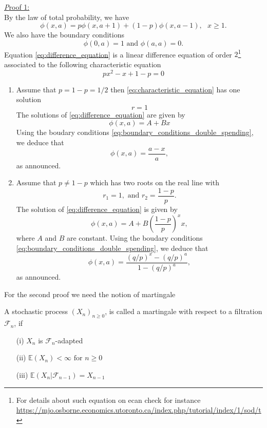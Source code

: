 \underline{\textit Proof 1:}\\
By the law of total probability, we have 
\begin{equation}\label{eq:difference_equation}
\phi(x,a) = p\phi(x,a+1)+(1-p)\phi(x,a-1),\text{ }x\geq1.
\end{equation}
We also have the boundary conditions
\begin{equation}\label{eq:boundary_conditions_double_spending}
\phi(0,a) = 1\text{ and }\phi(a,a) = 0.
\end{equation}
Equation \eqref{eq:difference_equation} is a linear difference equation of order $2$\footnote{For details about such equation on ecan check for instance \url{https://mjo.osborne.economics.utoronto.ca/index.php/tutorial/index/1/sod/t}} associated to the following characteristic equation
\begin{equation}\label{eq:characteristic_equation}
px^2 - x + 1-p = 0
\end{equation}
\begin{enumerate}

\item Assume that $p=1-p=1/2$ then \eqref{eq:characteristic_equation} has one solution 
$$
r = 1
$$
The solutions of \eqref{eq:difference_equation} are given by 
$$
\phi(x,a) = A+Bx
$$
Using the boudary conditions \eqref{eq:boundary_conditions_double_spending}, we deduce that
$$
\phi(x,a) = \frac{a-x}{a},
$$
as announced.
\item Assume that $p\neq 1-p$
which has two roots on the real line with 
$$
r_1 = 1, \text{ and }r_2 = \frac{1-p}{p}.
$$
The solution of \eqref{eq:difference_equation} is given by 
$$
\phi(x,a)=A+B\left(\frac{1-p}{p}\right)^xx,
$$
where $A$ and $B$ are constant. Using the boudary conditions \eqref{eq:boundary_conditions_double_spending}, we deduce that
$$
\phi(x,a) = \frac{(q/p)^x-(q/p)^a}{1 - (q/p)^a},
$$
as announced.
\end{enumerate}
For the second proof we need the notion of martingale
\begin{definition}
A stochastic process $(X_n)_{n\geq0}$, is called a martingale with respect to a filtration $\mathcal{F}_n$, if
\begin{itemize}
  \item[(i)] $X_n$ is $\mathcal{F}_n$-adapted
  \item[(ii)] $\mathbb{E}(X_n)<\infty\text{ for }n\geq0$ 
  \item[(iii)] $\mathbb{E}(X_n|\mathcal{F}_{n-1}) = X_{n-1}$
\end{itemize} 
\end{definition}
